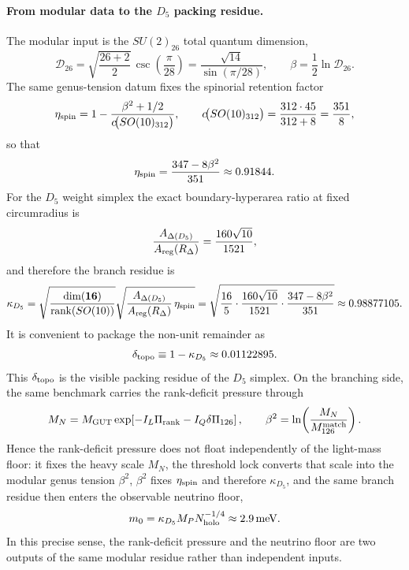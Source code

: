 \documentclass[11pt]{article}
\begin{document}
\paragraph{From modular data to the $D_5$ packing residue.}
The modular input is the $SU(2)_{26}$ total quantum dimension,
\begin{equation}
 \mathcal D_{26}
 =
 \sqrt{\frac{26+2}{2}}\,\csc\!\left(\frac{\pi}{28}\right)
 =
 \frac{\sqrt{14}}{\sin(\pi/28)},
 \qquad
 \beta = \frac12\ln\mathcal D_{26}.
\end{equation}
The same genus-tension datum fixes the spinorial retention factor
\begin{equation}
 \eta_{\rm spin}
 =
 1-\frac{\beta^2+1/2}{c\!\bigl(SO(10)_{312}\bigr)},
 \qquad
 c\!\bigl(SO(10)_{312}\bigr)=\frac{312\cdot45}{312+8}=\frac{351}{8},
\end{equation}
so that
\begin{equation}
 \eta_{\rm spin}=\frac{347-8\beta^2}{351}\approx0.91844.
\end{equation}
For the $D_5$ weight simplex the exact boundary-hyperarea ratio at fixed circumradius is
\begin{equation}
 \frac{A_{\Delta(D_5)}}{A_{\rm reg}(R_\Delta)}
 =
 \frac{160\sqrt{10}}{1521},
\end{equation}
and therefore the branch residue is
\begin{equation}
 \kappa_{D_5}
 =
 \sqrt{\frac{\dim(\mathbf{16})}{\operatorname{rank}(SO(10))}}
 \sqrt{\frac{A_{\Delta(D_5)}}{A_{\rm reg}(R_\Delta)}\,\eta_{\rm spin}}
 =
 \sqrt{\frac{16}{5}\cdot\frac{160\sqrt{10}}{1521}\cdot\frac{347-8\beta^2}{351}}
 \approx 0.98877105.
\end{equation}
It is convenient to package the non-unit remainder as
\begin{equation}
 \delta_{\rm topo}\equiv 1-\kappa_{D_5}\approx0.01122895.
\end{equation}
This $\delta_{\rm topo}$ is the visible packing residue of the $D_5$ simplex. On the branching side, the same benchmark carries the rank-deficit pressure through
\begin{equation}
 M_N
 =
 M_{\rm GUT}\exp\!\left[-I_L\Pi_{\rm rank}-I_Q\delta\Pi_{126}\right],
 \qquad
 \beta^2=\ln\!\left(\frac{M_N}{M_{126}^{\rm match}}\right).
\end{equation}
Hence the rank-deficit pressure does not float independently of the light-mass floor: it fixes the heavy scale $M_N$, the threshold lock converts that scale into the modular genus tension $\beta^2$, $\beta^2$ fixes $\eta_{\rm spin}$ and therefore $\kappa_{D_5}$, and the same branch residue then enters the observable neutrino floor,
\begin{equation}
 m_0
 =
 \kappa_{D_5}M_PN_{\rm holo}^{-1/4}
 \approx 2.9\,\mathrm{meV}.
\end{equation}
In this precise sense, the rank-deficit pressure and the neutrino floor are two outputs of the same modular residue rather than independent inputs.
\end{document}
